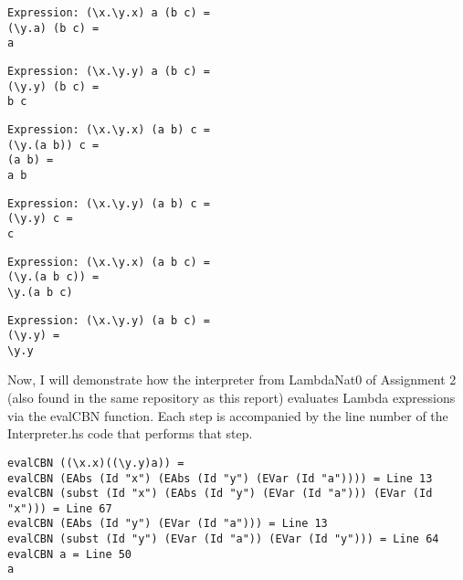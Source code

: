 \documentclass{article}
\theoremstyle{theorem}
\theoremstyle{definition}
\theoremstyle{remark}
\begin{document}
\begin{lstlisting}
Expression: (\x.\y.x) a (b c) =
(\y.a) (b c) =
a
\end{lstlisting}

\begin{lstlisting}
Expression: (\x.\y.y) a (b c) =
(\y.y) (b c) =
b c
\end{lstlisting}

\begin{lstlisting}
Expression: (\x.\y.x) (a b) c =
(\y.(a b)) c =
(a b) =
a b
\end{lstlisting}

\begin{lstlisting}
Expression: (\x.\y.y) (a b) c =
(\y.y) c =
c
\end{lstlisting}

\begin{lstlisting}
Expression: (\x.\y.x) (a b c) =
(\y.(a b c)) =
\y.(a b c)
\end{lstlisting}

\begin{lstlisting}
Expression: (\x.\y.y) (a b c) =
(\y.y) =
\y.y
\end{lstlisting}
%
Now, I will demonstrate how the interpreter from LambdaNat0 of Assignment 2 (also found in the same repository as this report) evaluates Lambda expressions via the evalCBN function. Each step is accompanied by the line number of the Interpreter.hs code that performs that step.

\begin{lstlisting}
evalCBN ((\x.x)((\y.y)a)) = 
evalCBN (EAbs (Id "x") (EAbs (Id "y") (EVar (Id "a")))) = Line 13
evalCBN (subst (Id "x") (EAbs (Id "y") (EVar (Id "a"))) (EVar (Id "x"))) = Line 67
evalCBN (EAbs (Id "y") (EVar (Id "a"))) = Line 13
evalCBN (subst (Id "y") (EVar (Id "a")) (EVar (Id "y"))) = Line 64
evalCBN a = Line 50
a
\end{lstlisting}
\end{document}
